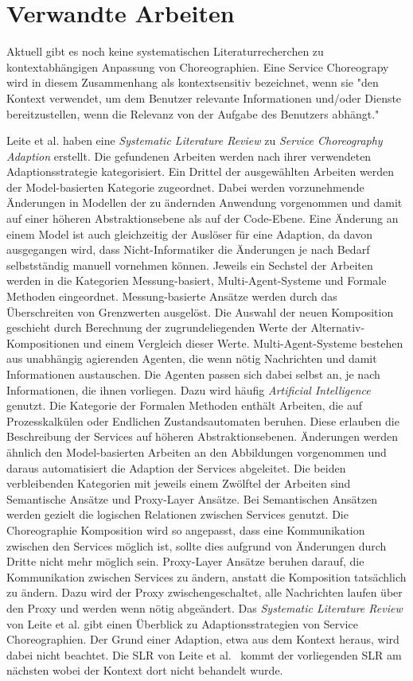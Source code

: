 \documentclass[conference,compsoc]{IEEEtran}
\begin{document}
\section{Verwandte Arbeiten}
Aktuell gibt es noch keine systematischen Literaturrecherchen zu kontextabhängigen Anpassung von Choreographien.
Eine Service Choreograpy wird in diesem Zusammenhang als kontextsensitiv bezeichnet, wenn sie "den Kontext verwendet, um dem Benutzer relevante Informationen und/oder Dienste bereitzustellen, wenn die Relevanz von der Aufgabe des Benutzers abhängt."~\cite[S.~2]{dey2001understanding}

Leite et al. \cite{leite2013systematic} haben eine \textit{Systematic Literature Review} zu \textit{Service Choreography Adaption} erstellt. Die gefundenen Arbeiten werden nach ihrer verwendeten Adaptionsstrategie kategorisiert. Ein Drittel der ausgewählten Arbeiten werden der Model-basierten Kategorie zugeordnet. Dabei werden vorzunehmende Änderungen in Modellen der zu ändernden Anwendung vorgenommen und damit auf einer höheren Abstraktionsebene als auf der Code-Ebene. Eine Änderung an einem Model ist auch gleichzeitig der Auslöser für eine Adaption, da davon ausgegangen wird, dass Nicht-Informatiker die Änderungen je nach Bedarf selbstständig manuell vornehmen können. Jeweils ein Sechstel der Arbeiten werden in die Kategorien Messung-basiert, Multi-Agent-Systeme und Formale Methoden eingeordnet. Messung-basierte Ansätze werden durch das Überschreiten von Grenzwerten ausgelöst. Die Auswahl der neuen Komposition geschieht durch Berechnung der zugrundeliegenden Werte der Alternativ-Kompositionen und einem Vergleich dieser Werte. Multi-Agent-Systeme bestehen aus unabhängig agierenden Agenten, die wenn nötig Nachrichten und damit Informationen austauschen. Die Agenten passen sich dabei selbst an, je nach Informationen, die ihnen vorliegen. Dazu wird häufig \textit{Artificial Intelligence} genutzt. Die Kategorie der Formalen Methoden enthält Arbeiten, die auf Prozesskalkülen oder Endlichen Zustandsautomaten beruhen. Diese erlauben die Beschreibung der Services auf höheren Abstraktionsebenen. Änderungen werden ähnlich den Model-basierten Arbeiten an den Abbildungen vorgenommen und daraus automatisiert die Adaption der Services abgeleitet. Die beiden verbleibenden Kategorien mit jeweils einem Zwölftel der Arbeiten sind Semantische Ansätze und Proxy-Layer Ansätze. Bei Semantischen Ansätzen werden gezielt die logischen Relationen zwischen Services genutzt. Die Choreographie Komposition wird so angepasst, dass eine Kommunikation zwischen den Services möglich ist, sollte dies aufgrund von Änderungen durch Dritte nicht mehr möglich sein. Proxy-Layer Ansätze beruhen darauf, die Kommunikation zwischen Services zu ändern, anstatt die Komposition tatsächlich zu ändern. Dazu wird der Proxy zwischengeschaltet, alle Nachrichten laufen über den Proxy und werden wenn nötig abgeändert.
Das \textit{Systematic Literature Review} von Leite et al. \cite{leite2013systematic} gibt einen Überblick zu Adaptionsstrategien von Service Choreographien. Der Grund einer Adaption, etwa aus dem Kontext heraus, wird dabei nicht beachtet.
Die SLR von Leite et al.~\cite{leite2013systematic} kommt der vorliegenden SLR am nächsten wobei der Kontext dort nicht behandelt wurde.
\end{document}
